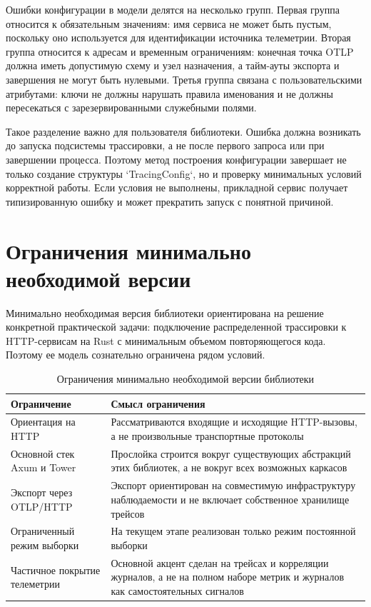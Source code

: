 Ошибки конфигурации в модели делятся на несколько групп. Первая группа относится к
обязательным значениям: имя сервиса не может быть пустым, поскольку оно
используется для идентификации источника телеметрии. Вторая группа относится к
адресам и временным ограничениям: конечная точка OTLP должна иметь допустимую
схему и узел назначения, а тайм-ауты экспорта и завершения не могут быть
нулевыми. Третья группа связана с пользовательскими атрибутами: ключи не должны
нарушать правила именования и не должны пересекаться с зарезервированными
служебными полями.

Такое разделение важно для пользователя библиотеки. Ошибка должна возникать до
запуска подсистемы трассировки, а не после первого запроса или при завершении
процесса. Поэтому метод построения конфигурации завершает не только создание
структуры `TracingConfig`, но и проверку минимальных условий корректной работы.
Если условия не выполнены, прикладной сервис получает типизированную ошибку и
может прекратить запуск с понятной причиной.

\section{Ограничения минимально необходимой версии}

Минимально необходимая версия библиотеки ориентирована на решение конкретной
практической задачи: подключение распределенной трассировки к HTTP-сервисам на
Rust с минимальным объемом повторяющегося кода. Поэтому ее модель сознательно
ограничена рядом условий.

\begin{table}[H]
    \centering
    \caption{Ограничения минимально необходимой версии библиотеки}
    \label{tab:mvp-limitations}
    \renewcommand{\arraystretch}{1.2}
    \begin{tabularx}{\textwidth}{>{\raggedright\arraybackslash}p{4.4cm} >{\raggedright\arraybackslash}X}
        \toprule
        Ограничение & Смысл ограничения \\
        \midrule
        Ориентация на HTTP & Рассматриваются входящие и исходящие HTTP-вызовы, а не произвольные транспортные протоколы \\
        \addlinespace
        Основной стек Axum и Tower & Прослойка строится вокруг существующих абстракций этих библиотек, а не вокруг всех возможных каркасов \\
        \addlinespace
        Экспорт через OTLP/HTTP & Экспорт ориентирован на совместимую инфраструктуру наблюдаемости и не включает собственное хранилище трейсов \\
        \addlinespace
        Ограниченный режим выборки & На текущем этапе реализован только режим постоянной выборки \\
        \addlinespace
        Частичное покрытие телеметрии & Основной акцент сделан на трейсах и корреляции журналов, а не на полном наборе метрик и журналов как самостоятельных сигналов \\
        \bottomrule
    \end{tabularx}
\end{table}

